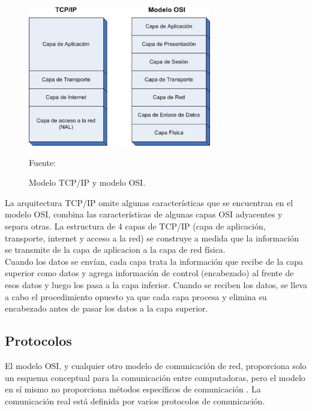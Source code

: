 \begin{figure}[H]
    \begin{center}
        \includegraphics[width=8cm]{img/capitulo_2/tcp_ip_osi.jpg}\\    
    \end{center}
    \begin{center}
        \caption{Modelo TCP/IP y modelo OSI.}
        Fuente: \cite{tcpiposi}
        \label{fig:tcpip}    
    \end{center}
\end{figure}

La arquitectura TCP/IP omite algunas características que se encuentran en el modelo OSI, combina las características de algunas capas OSI adyacentes y separa otras. La estructura de 4 capas de TCP/IP (capa de aplicación, transporte, internet y acceso a la red) se construye a medida que la información se transmite de la capa de aplicacion a la capa de red física.\\

Cuando los datos se envían, cada capa trata la información que recibe de la capa superior como datos y agrega información de control (encabezado) al frente de esos datos y luego los pasa a la capa inferior. Cuando se reciben los datos, se lleva a cabo el procedimiento opuesto ya que cada capa procesa y elimina su encabezado antes de pasar los datos a la capa superior.\\

\subsection{Protocolos}
El modelo OSI, y cualquier otro modelo de comunicación de red, proporciona solo un esquema conceptual para la comunicación entre computadoras, pero el modelo en sí mismo no proporciona métodos específicos de comunicación \cite{wikipedia:modeloosi}. La comunicación real está definida por varios protocolos de comunicación.\\


